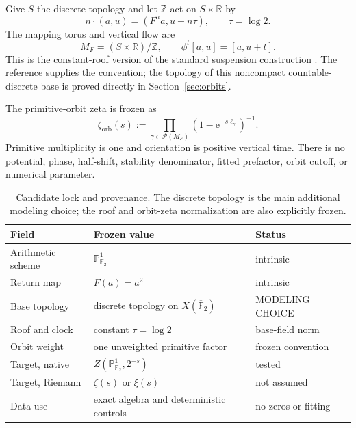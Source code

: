 \documentclass[11pt]{article}
\theoremstyle{definition}
\theoremstyle{remark}
\newcommand{\R}{\mathbb{R}}
\newcommand{\Z}{\mathbb{Z}}
\newcommand{\F}{\mathbb{F}}
\newcommand{\cP}{\mathcal{P}}
\newcommand{\e}{\mathrm{e}}
\newcommand{\modelchoice}{\textsf{MODELING CHOICE}}
\begin{document}
Give \(S\) the discrete topology and let \(\Z\) act on \(S\times\R\) by
\begin{equation}
  n\cdot(a,u)=(F^n a,u-n\tau),\qquad \tau=\log2.
  \label{eq:action}
\end{equation}
The mapping torus and vertical flow are
\begin{equation}
  M_F=(S\times\R)/\Z,
  \qquad
  \phi^t[a,u]=[a,u+t].
  \label{eq:suspension}
\end{equation}
This is the constant-roof version of the standard suspension construction
\citep[Chap.~6]{ParryPollicott1990}.  The reference supplies the convention;
the topology of this noncompact countable-discrete base is proved directly in
Section~\ref{sec:orbits}.

The primitive-orbit zeta is frozen as
\begin{equation}
  \zeta_{\mathrm{orb}}(s)
    :=\prod_{\gamma\in\cP(M_F)}
      \left(1-\e^{-s\ell_\gamma}\right)^{-1}.
  \label{eq:orbit-zeta}
\end{equation}
Primitive multiplicity is one and orientation is positive vertical time.
There is no potential, phase, half-shift, stability denominator, fitted
prefactor, orbit cutoff, or numerical parameter.

\begin{table}[t]
\centering
\caption{Candidate lock and provenance.  The discrete topology is the main
additional modeling choice; the roof and orbit-zeta normalization are also
explicitly frozen.}
\label{tab:lock}
\small
\begin{tabularx}{\textwidth}{@{}p{}X p{}@{}}
\toprule
Field & Frozen value & Status\\
\midrule
Arithmetic scheme & \(\mathbb P^1_{\F_2}\) & intrinsic\\
Return map & \(F(a)=a^2\) & intrinsic\\
Base topology & discrete topology on \(X(\overline{\F}_2)\) & \modelchoice\\
Roof and clock & constant \(\tau=\log2\) & base-field norm\\
Orbit weight & one unweighted primitive factor & frozen convention\\
Target, native & \(Z(\mathbb P^1_{\F_2},2^{-s})\) & tested\\
Target, Riemann & \(\zeta(s)\) or \(\xi(s)\) & not assumed\\
Data use & exact algebra and deterministic controls & no zeros or fitting\\
\bottomrule
\end{tabularx}
\end{table}
\end{document}

